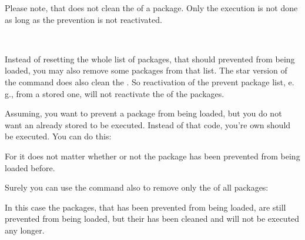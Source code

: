 Please note, that 
does not clean the  of a package. Only the execution is not
done as long as the prevention is not reactivated.%
%
%

\begin{Declaration}
  \\
\end{Declaration}
%
%
Instead of resetting the whole list of
packages, that should prevented from being loaded, you may also remove some
packages from that list. The star version of the command does also clean the
. So reactivation of the prevent package list, e.\,g.,
from a stored one, will not reactivate the  of the
packages.%
%
\begin{Example}
  Assuming, you want to prevent a package  from being loaded, but
  you do not want an already stored  to be
  executed. Instead of that code, you're own  should be
  executed. You can do this:
\begin{lstcode}
\end{lstcode}
  For  it does not matter whether or not
  the package has been prevented from being loaded before.

  Surely you can use the command also to remove only the 
  of all packages:
\begin{lstcode}
  \StorePreventPackageFromLoading\TheWholePreventList
  \UnPreventPackageFromLoading*{\TheWholePreventList}
  \PreventPackageFromLoading{\TheWholePreventList}
\end{lstcode}
  In this case the packages, that has been prevented from being loaded, are
  still prevented from being loaded, but their  has been
  cleaned and will not be executed any longer.%
\end{Example}%
%
%
%

\endinput


